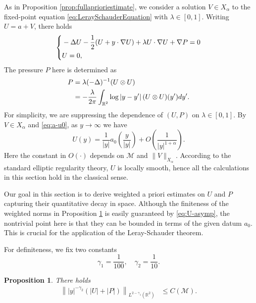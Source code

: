 \documentclass[12pt,reqno]{amsart}
\theoremstyle{plain}
\newtheorem{proposition}[theorem]{Proposition}
\theoremstyle{definition}
\newcommand{\R}{\mathbb{R}}
\newcommand{\M}{\mathcal{M}}
\renewcommand{\:}{\colon}
\let\div\relax
\DeclareMathOperator{\div}{div}
\numberwithin{equation}{section}
\numberwithin{figure}{section}
\begin{document}
As in Proposition \ref{prop:fullaprioriestimate}, we consider a solution $V \in X_\alpha$ to the fixed-point equation \eqref{eq:LeraySchauderEquation} with $\lambda \in [0,1]$.  Writing $U = a + V$, there holds
\begin{equation} \label{eq:Ulambda}
	\left\{\begin{aligned}
	&- \Delta U - \frac{1}{2} (U + y \cdot \nabla U) + \lambda U \cdot \nabla U + \nabla P = 0 \\
	&\div U = 0,
	\end{aligned}\right.
\end{equation}
The pressure $P$ here is determined as
\begin{align} \label{eq:P-def}
	 P &= \lambda (-\Delta)^{-1} \div \div (U \otimes U) \nonumber \\
     & = - \frac{\lambda }{2\pi} \int_{\R^2}  \log |y-y'| \, \div  \div  (U\otimes U) (y') dy'.
\end{align}
For simplicity, we are suppressing the dependence of $(U,P)$ on $\lambda \in [0,1]$. By $V \in X_\alpha$ and \eqref{eq:a-u0}, as $y \to \infty$ we have
\begin{equation} \label{eq:U-asymp}
    U(y)  =  \frac{1}{|y|} a_0\left(\frac{y}{|y|}\right) + O\left(\frac{1}{|y|^{1+\alpha}}\right).
\end{equation}
Here the constant in $O(\cdot)$ depends on $\M$ and $\|V\|_{X_\alpha}$. According to the standard elliptic regularity theory, $U$ is locally smooth, hence all the calculations in this section hold in the classical sense. 

Our goal in this section is to derive weighted a priori estimates on $U$ and $P$ capturing their quantitative decay in space.  Although the finiteness of the weighted norms in Proposition \ref{prop:elliptic} is easily guaranteed by \eqref{eq:U-asymp}, the nontrivial point here is that they can be bounded in terms of the given datum $a_0$.  This is crucial for the application of the Leray-Schauder theorem.

For definiteness, we fix two constants
\begin{equation}
	\gamma_1 = \frac{1}{100}, \quad \gamma_2 = \frac{1}{10}.
\end{equation}



\begin{proposition} \label{prop:elliptic}
 There holds
	\begin{align} \label{eq:key-weighted-UP}
		\left\||y|^{-\gamma_2} (|U|+|P|)\right\|_{L^{2-\gamma_1}(\R^2)} 
		&\le C(\M).
	\end{align} 
\end{proposition}
\end{document}
